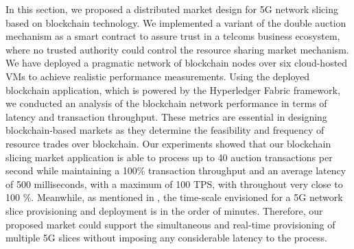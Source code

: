 In this section, we proposed a distributed market design for \ac{5G} network slicing based on blockchain technology. We implemented a variant of the double auction mechanism as a smart contract to assure trust in a telcoms business ecosystem, where no trusted authority could control the resource sharing market mechanism. We have deployed a pragmatic network of blockchain nodes over six cloud-hosted \acp{VM} to achieve realistic performance measurements. Using the deployed blockchain application, which is powered by the Hyperledger Fabric framework, we conducted an analysis of the blockchain network performance in terms of latency and transaction throughput. These metrics are essential in designing blockchain-based markets as they determine the feasibility and frequency of resource trades over blockchain. Our experiments showed that our blockchain slicing market application is able to process up to 40 auction transactions per second while maintaining a 100\% transaction throughput and an average latency of 500 milliseconds, with a maximum of 100 TPS, with throughout very close to 100 \%.
Meanwhile, as mentioned in \cite{valcarenghireliable}, the time-scale envisioned for a \ac{5G} network slice provisioning and deployment is in the order of minutes. Therefore, our proposed market could support the simultaneous and real-time provisioning of multiple \ac{5G} slices without imposing any considerable latency to the process.



